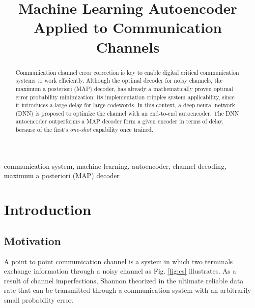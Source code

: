 \documentclass[conference]{IEEEtran}
\begin{document}
\title{Machine Learning Autoencoder Applied to Communication Channels}


\author{
}



\maketitle

\begin{abstract}

Communication channel error correction is key to enable digital critical communication systems to work efficiently. Although the optimal decoder for noisy channels, the maximum a posteriori (MAP) decoder, has already a mathematically proven optimal error probability minimization; its implementation cripples system applicability, since it introduces a large delay for large codewords. In this context, a deep neural network (DNN) is proposed to optimize the channel with an end-to-end autoencoder. The DNN autoencoder outperforms a MAP decoder form a given encoder in terms of delay, because of the first`s \textit{one-shot} capability once trained.

\end{abstract}

\begin{IEEEkeywords}
communication system, machine learning,  autoencoder, channel decoding, maximum a posteriori (MAP) decoder 
\end{IEEEkeywords}

\section{Introduction}
\subsection{Motivation}
A point to point communication channel is a system in which  two terminals exchange information through a noisy channel as Fig. \ref{fig:cs} illustrates. As a result of channel imperfections, Shannon theorized in \cite{b1} the ultimate reliable data rate that can be transmitted through a communication system with an arbitrarily small probability error. 
\end{document}
